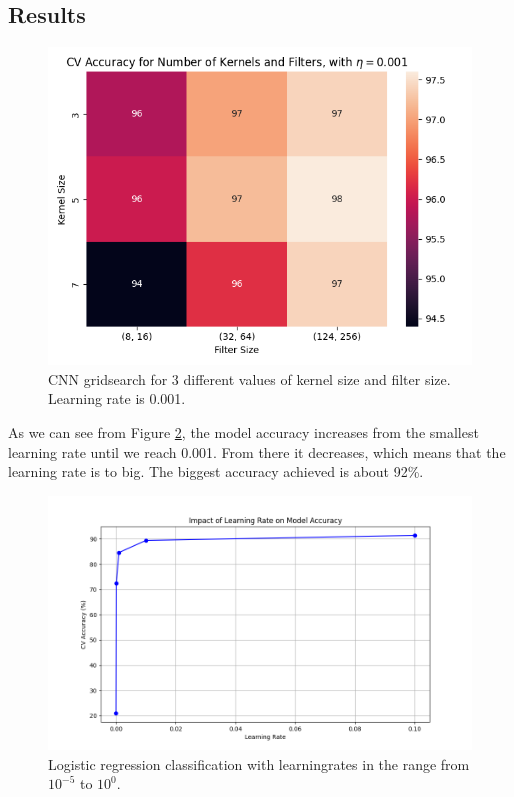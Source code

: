 \subsection{Results}

\begin{figure}[H]
    \centering
    \includegraphics[width=\textwidth]{results/cnn_grid_search/heatmap_grid_search.png}
    \caption{CNN gridsearch for 3 different values of kernel size and filter size. Learning rate is 0.001.}
    \label{fig:LogRegEpochs}
\end{figure}

\newpage
As we can see from Figure \ref{fig:LogRegLearningRate}, the model accuracy increases from the smallest learning rate until we reach 0.001. From there it decreases, which means that the learning rate is to big. The biggest accuracy achieved is about 92\%.

\begin{figure}[H]
    \centering
    \includegraphics[width=\textwidth]{results/logreg/learning_rate_study.png}
    \caption{Logistic regression classification with learningrates in the range from $10^{-5}$ to $10^0$.}
    \label{fig:LogRegLearningRate}
\end{figure}

